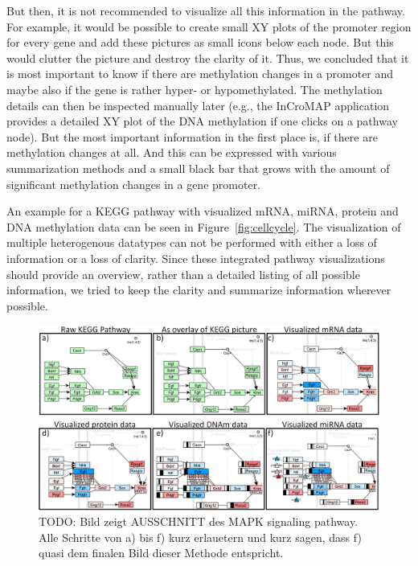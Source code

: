 \documentclass{bioinfo}
\begin{document}
But then, it is not recommended to visualize all this information in the pathway. For example, it would be possible to create small XY plots of the promoter region for every gene and add these pictures as small icons below each node. But this would clutter the picture and destroy the clarity of it. Thus, we concluded that it is most important to know if there are methylation changes in a promoter and maybe also if the gene is rather hyper- or hypomethylated. The methylation details can then be inspected manually later (e.g., the InCroMAP application provides a detailed XY plot of the DNA methylation if one clicks on a pathway node). But the most important information in the first place is, if there are methylation changes at all. And this can be expressed with various summarization methods and a small black bar that grows with the amount of significant methylation changes in a gene promoter.

An example for a KEGG pathway with visualized mRNA, miRNA, protein and DNA methylation data can be seen in Figure~\ref{fig:cellcycle}. The visualization of multiple heterogenous datatypes can not be performed with either a loss of information or a loss of clarity. Since these integrated pathway visualizations should provide an overview, rather than a detailed listing of all possible information, we tried to keep the clarity and summarize information wherever possible.





\begin{figure}[t]
\centering
\includegraphics[width=1.0\textwidth]{figures/visualization-steps.png}
\caption{
TODO: Bild zeigt AUSSCHNITT des MAPK signaling pathway. Alle Schritte von a) bis f) kurz erlauetern und kurz sagen, dass f) quasi dem finalen Bild dieser Methode entspricht. }\label{fig:visualization_steps}
\end{figure}
\end{document}
